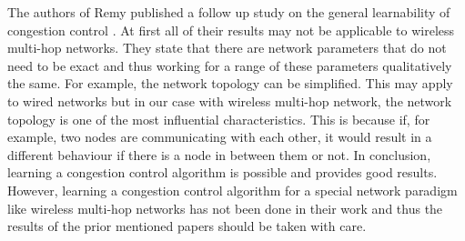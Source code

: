 The authors of Remy published a follow up study on the general learnability of congestion control \cite{learnCC}. At first all of their results may not be applicable to wireless multi-hop networks. They state that there are network parameters that do not need to be exact and thus working for a range of these parameters qualitatively the same. For example, the network topology can be simplified. This may apply to wired networks but in our case with wireless multi-hop network, the network topology is one of the most influential characteristics. This is because if, for example, two nodes are communicating with each other, it would result in a different behaviour if there is a node in between them or not. In conclusion, learning a congestion control algorithm is possible and provides good results. However, learning a congestion control algorithm for a special network paradigm like wireless multi-hop networks has not been done in their work and thus the results of the prior mentioned papers should be taken with care.

